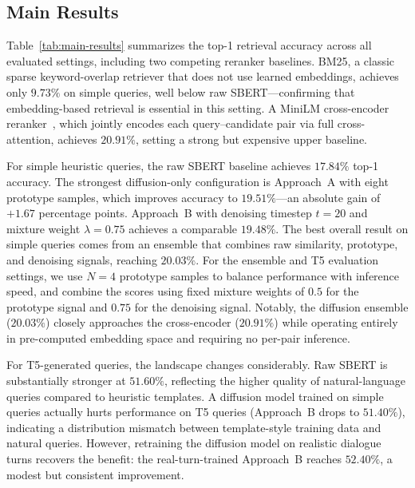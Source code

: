 \documentclass{article}
\begin{document}
\subsection{Main Results}

Table~\ref{tab:main-results} summarizes the top-1 retrieval accuracy across all evaluated settings, including two competing reranker baselines. BM25, a classic sparse keyword-overlap retriever that does not use learned embeddings, achieves only $9.73\%$ on simple queries, well below raw SBERT---confirming that embedding-based retrieval is essential in this setting. A MiniLM cross-encoder reranker~\cite{nogueira2020passage}, which jointly encodes each query--candidate pair via full cross-attention, achieves $20.91\%$, setting a strong but expensive upper baseline.

For simple heuristic queries, the raw SBERT baseline achieves $17.84\%$ top-1 accuracy. The strongest diffusion-only configuration is Approach~A with eight prototype samples, which improves accuracy to $19.51\%$---an absolute gain of $+1.67$ percentage points. Approach~B with denoising timestep $t=20$ and mixture weight $\lambda=0.75$ achieves a comparable $19.48\%$. The best overall result on simple queries comes from an ensemble that combines raw similarity, prototype, and denoising signals, reaching $20.03\%$. For the ensemble and T5 evaluation settings, we use $N=4$ prototype samples to balance performance with inference speed, and combine the scores using fixed mixture weights of $0.5$ for the prototype signal and $0.75$ for the denoising signal. Notably, the diffusion ensemble ($20.03\%$) closely approaches the cross-encoder ($20.91\%$) while operating entirely in pre-computed embedding space and requiring no per-pair inference.

For T5-generated queries, the landscape changes considerably. Raw SBERT is substantially stronger at $51.60\%$, reflecting the higher quality of natural-language queries compared to heuristic templates. A diffusion model trained on simple queries actually hurts performance on T5 queries (Approach~B drops to $51.40\%$), indicating a distribution mismatch between template-style training data and natural queries. However, retraining the diffusion model on realistic dialogue turns recovers the benefit: the real-turn-trained Approach~B reaches $52.40\%$, a modest but consistent improvement.
\end{document}

